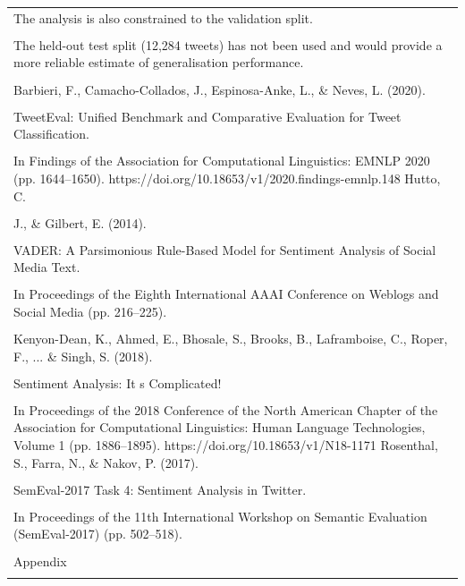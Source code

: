 \documentclass[11pt]{article}
\begin{document}
\begin{longtable}{|p{\dimexpr\linewidth-2\tabcolsep-2\arrayrulewidth\relax}|}
\hline
\rule{0pt}{3.5cm} \\
\hline
The analysis is also constrained to the validation split. \\[2pt]
\hline
\rule{0pt}{3.5cm} \\
\hline
The held-out test split (12,284 tweets) has not been used and would provide a more reliable estimate of generalisation performance. \\[2pt]
\hline
\rule{0pt}{3.5cm} \\
\hline
Barbieri, F., Camacho-Collados, J., Espinosa-Anke, L., \& Neves, L. (2020). \\[2pt]
\hline
\rule{0pt}{3.5cm} \\
\hline
TweetEval: Unified Benchmark and Comparative Evaluation for Tweet Classification. \\[2pt]
\hline
\rule{0pt}{3.5cm} \\
\hline
In Findings of the Association for Computational Linguistics: EMNLP 2020 (pp. 1644--1650). https://doi.org/10.18653/v1/2020.findings-emnlp.148 Hutto, C. \\[2pt]
\hline
\rule{0pt}{3.5cm} \\
\hline
J., \& Gilbert, E. (2014). \\[2pt]
\hline
\rule{0pt}{3.5cm} \\
\hline
VADER: A Parsimonious Rule-Based Model for Sentiment Analysis of Social Media Text. \\[2pt]
\hline
\rule{0pt}{3.5cm} \\
\hline
In Proceedings of the Eighth International AAAI Conference on Weblogs and Social Media (pp. 216--225). \\[2pt]
\hline
\rule{0pt}{3.5cm} \\
\hline
Kenyon-Dean, K., Ahmed, E., Bhosale, S., Brooks, B., Laframboise, C., Roper, F., ... \& Singh, S. (2018). \\[2pt]
\hline
\rule{0pt}{3.5cm} \\
\hline
Sentiment Analysis: It s Complicated! \\[2pt]
\hline
\rule{0pt}{3.5cm} \\
\hline
In Proceedings of the 2018 Conference of the North American Chapter of the Association for Computational Linguistics: Human Language Technologies, Volume 1 (pp. 1886--1895). https://doi.org/10.18653/v1/N18-1171 Rosenthal, S., Farra, N., \& Nakov, P. (2017). \\[2pt]
\hline
\rule{0pt}{3.5cm} \\
\hline
SemEval-2017 Task 4: Sentiment Analysis in Twitter. \\[2pt]
\hline
\rule{0pt}{3.5cm} \\
\hline
In Proceedings of the 11th International Workshop on Semantic Evaluation (SemEval-2017) (pp. 502--518). \\[2pt]
\hline
\rule{0pt}{3.5cm} \\
\hline
Appendix \\[2pt]
\hline
\rule{0pt}{3.5cm} \\
\hline
\end{longtable}
\end{document}
